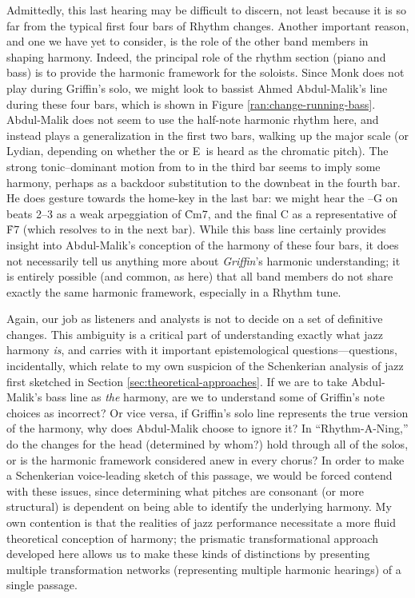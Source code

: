 Admittedly, this last hearing may be difficult to discern, not least because
it is so far from the typical first four bars of Rhythm changes. Another
important reason, and one we have yet to consider, is the role of the other
band members in shaping harmony. Indeed, the principal role of the rhythm
section (piano and bass) is to provide the harmonic framework for the
soloists. Since Monk does not play during Griffin's solo, we might look to
bassist Ahmed Abdul-Malik's line during these four bars, which is shown in
Figure \ref{ran:change-running-bass}. Abdul-Malik does not seem to use the
half-note harmonic rhythm here, and instead plays a generalization in the
first two bars, walking up the \Bflat major scale (or Lydian, depending on
whether the \Eflat or E\nat\ is heard as the chromatic pitch). The strong
tonic--dominant motion from \Aflat to \Eflat in the third bar seems to imply
some \Aflat harmony, perhaps as a backdoor substitution to the downbeat \Bflat
in the fourth bar. He does gesture towards the home-key \tf in the last bar:
we might hear the \Bflat--G on beats 2--3 as a weak arpeggiation of \h{Cm7},
and the final C as a representative of \h{F7} (which resolves to \Bflat in the
next bar). While this bass line certainly provides insight into Abdul-Malik's
conception of the harmony of these four bars, it does not necessarily tell us
anything more about \emph{Griffin}'s harmonic understanding; it is entirely
possible (and common, as here) that all band members do not share exactly the
same harmonic framework, especially in a Rhythm tune.

Again, our job as listeners and analysts is not to decide on a set of
definitive changes. This ambiguity is a critical part of understanding exactly
what jazz harmony \emph{is}, and carries with it important epistemological
questions---questions, incidentally, which relate to my own suspicion of the
Schenkerian analysis of jazz first sketched in Section
\ref{sec:theoretical-approaches}. If we are to take Abdul-Malik's bass line as
\emph{the} harmony, are we to understand some of Griffin's note choices as
incorrect? Or vice versa, if Griffin's solo line represents the true version
of the harmony, why does Abdul-Malik choose to ignore it? In
``Rhythm-A-Ning,'' do the changes for the head (determined by whom?) hold
through all of the solos, or is the harmonic framework considered anew in
every chorus? In order to make a Schenkerian voice-leading sketch of this
passage, we would be forced contend with these issues, since determining what
pitches are consonant (or more structural) is dependent on being able to
identify the underlying harmony. My own contention is that the
realities of jazz performance necessitate a more fluid theoretical conception
of harmony; the prismatic transformational approach developed here allows us
to make these kinds of distinctions by presenting multiple transformation
networks (representing multiple harmonic hearings) of a single passage.

